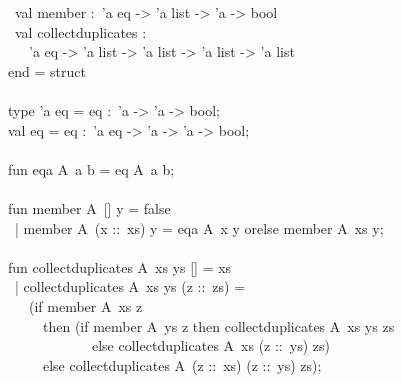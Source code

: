 \begin{isabellebody}
\begin{isamarkuptext}
\hspace*{0pt} ~val member :~'a eq -> 'a list -> 'a -> bool\\
\hspace*{0pt} ~val collect{}duplicates :\\
\hspace*{0pt} ~~~'a eq -> 'a list -> 'a list -> 'a list -> 'a list\\
\hspace*{0pt}end = struct\\
\hspace*{0pt}\\
\hspace*{0pt}type 'a eq = {}eq :~'a -> 'a -> bool{};\\
\hspace*{0pt}val eq = {}eq :~'a eq -> 'a -> 'a -> bool;\\
\hspace*{0pt}\\
\hspace*{0pt}fun eqa A{}~a b = eq A{}~a b;\\
\hspace*{0pt}\\
\hspace*{0pt}fun member A{}~[] y = false\\
\hspace*{0pt} ~| member A{}~(x ::~xs) y = eqa A{}~x y orelse member A{}~xs y;\\
\hspace*{0pt}\\
\hspace*{0pt}fun collect{}duplicates A{}~xs ys [] = xs\\
\hspace*{0pt} ~| collect{}duplicates A{}~xs ys (z ::~zs) =\\
\hspace*{0pt} ~~~(if member A{}~xs z\\
\hspace*{0pt} ~~~~~then (if member A{}~ys z then collect{}duplicates A{}~xs ys zs\\
\hspace*{0pt} ~~~~~~~~~~~~else collect{}duplicates A{}~xs (z ::~ys) zs)\\
\hspace*{0pt} ~~~~~else collect{}duplicates A{}~(z ::~xs) (z ::~ys) zs);\\

\end{isamarkuptext}
\end{isabellebody}
